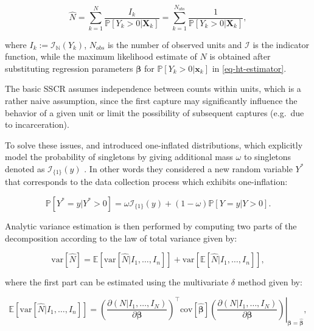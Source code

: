 \documentclass[
]{jss}
\newcommand{\1}{\mathcal{I}} \newcommand{\bZero}{\boldsymbol{0}}
\begin{document}
\begin{equation}
\hat{N}=
\sum_{k=1}^{N}\frac{I_{k}}{\mathbb{P}[Y_{k}>0|\boldsymbol{X}_{k}]}=
\sum_{k=1}^{N_{obs}}\frac{1}{\mathbb{P}[Y_{k}>0|\boldsymbol{X}_{k}]},
\label{eq-ht-estimator}
\end{equation}

where \(I_{k}:=\mathcal{I}_{\mathbb{N}}(Y_{k})\), \(N_{obs}\) is the
number of observed units and \(\mathcal{I}\) is the indicator function,
while the maximum likelihood estimate of \(N\) is obtained after
substituting regression parameters \(\boldsymbol{\beta}\) for
\(\mathbb{P}[Y_{k}>0|\boldsymbol{x}_{k}]\) in \eqref{eq-ht-estimator}.

The basic SSCR assumes independence between counts within units, which
is a rather naive assumption, since the first capture may significantly
influence the behavior of a given unit or limit the possibility of
subsequent captures (e.g.~due to incarceration).

To solve these issues, \citet{godwin2017estimation} and
\citet{ztoi-oizt-poisson} introduced one-inflated distributions, which
explicitly model the probability of singletons by giving additional mass
\(\omega\) to singletons denoted as \(\mathcal{I}_{\{1\}}(y)\)
\citep[cf.][]{bohning2024one}. In other words they considered a new
random variable \(Y^{\ast}\) that corresponds to the data collection
process which exhibits one-inflation:

\begin{equation*}
  \mathbb{P}\left[Y^{\ast}=y|Y^{\ast}>0\right] =
  \omega\mathcal{I}_{\{1\}}(y)+(1-\omega)\mathbb{P}[Y=y|Y>0].
\end{equation*}

Analytic variance estimation is then performed by computing two parts of
the decomposition according to the law of total variance given by:

\begin{equation}\label{eq-law_of_total_variance_decomposition}
  \text{var}[\hat{N}] = \mathbb{E}\left[\text{var}
  \left[\hat{N}|I_{1},\dots,I_{n}\right]\right] + 
  \text{var}\left[\mathbb{E}[\hat{N}|I_{1},\dots,I_{n}]\right],
\end{equation}

where the first part can be estimated using the multivariate \(\delta\)
method given by:

\begin{equation*}
  \mathbb{E}\left[\text{var} \left[\hat{N}|I_{1},\dots,I_{n}\right]\right] =
  \left.\left(\frac{\partial(N|I_1,\dots,I_N)}{\partial\boldsymbol{\beta}}\right)^\top
  \text{cov}\left[\hat{\boldsymbol{\beta}}\right]
  \left(\frac{\partial(N|I_1,\dots,I_N)}{\partial\boldsymbol{\beta}}\right)
  \right|_{\boldsymbol{\beta}=\hat{\boldsymbol{\beta}}},
\end{equation*}
\end{document}
